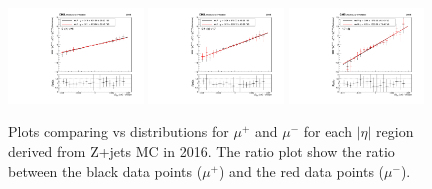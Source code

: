 \begin{figure}[h!]
    \centering
    \includegraphics[width=0.32\textwidth]{images_geofit/muCharge_eta_0_0p9_2016.pdf}
    \includegraphics[width=0.32\textwidth]{images_geofit/muCharge_eta_0p9_1p7_2016.pdf}
    \includegraphics[width=0.32\textwidth]{images_geofit/muCharge_eta_1p7_inf_2016.pdf}
    \caption{Plots comparing \dptoverptsquare vs \dzeroBS distributions for $\mu^+$ and $\mu^-$ for each $|\eta|$ region derived from Z+jets MC in 2016. The ratio plot show the ratio between the black data points ($\mu^+$) and the red data points ($\mu^-$).}
    \label{fig:muCharge_d0_2016}
\end{figure}

